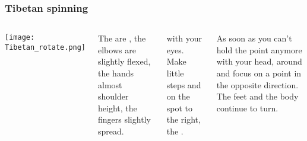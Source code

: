 

\begin{frame}
\frametitle{Tibetan spinning}
\hypertarget{hemi}{}
\begin{columns}[c] %

	\texttt{[image: Tibetan\_rotate.png]}

The  are , the elbows are slightly flexed, the hands almost shoulder height, the fingers slightly spread. 

 with your eyes. Make little steps and  on the spot to the right, the . 

As soon as you can't hold the point                                                                                       anymore with your head,  around and focus on a point in the opposite direction. The feet and the body continue to turn.


\end{columns}
\end{frame}
